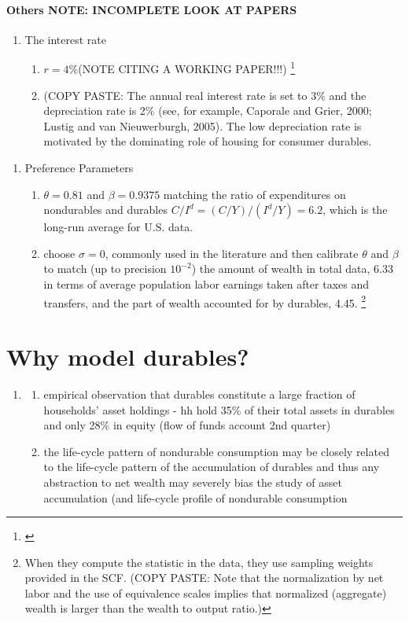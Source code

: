 \documentclass[a4paper,12pt]{article}
\begin{document}
\paragraph{Others NOTE: INCOMPLETE LOOK AT PAPERS}
\begin{enumerate}
\item The interest rate
\begin{enumerate}
\item \citep{FV&K2011} $r = 4\%$(NOTE CITING A WORKING PAPER!!!) \footnote{\citep{mcgrattan2001}}

\item \citep{hintermaier2010} (COPY PASTE: The annual real interest rate is set to 3\% and the depreciation rate is 2\% (see, for example, Caporale and Grier, 2000; Lustig and van Nieuwerburgh, 2005). The low depreciation rate is motivated by the dominating role of housing for consumer durables.
\end{enumerate}
\end{enumerate}

\begin{enumerate}
\item Preference Parameters
\begin{enumerate}
\item  \citep{FV&K2011} $\theta = 0.81$ and $\beta = 0.9375$ matching the ratio of expenditures on nondurables and durables $C/I^{d} = (C/Y)/(I^{d}/Y) = 6.2$, which is the long-run average for U.S. data.

\item \cite{hintermaier2010} choose $\sigma = 0$, commonly used in the literature and then calibrate $\theta$ and $\beta$ to match (up to precision $10^{-2}$) the amount of wealth in total data, 6.33 in terms of average population labor earnings taken after taxes and transfers, and the part of wealth accounted for by durables, 4.45. \footnote{When they compute the statistic in the data, they use sampling weights provided in the SCF. (COPY PASTE: Note that the normalization by net labor and the use of equivalence scales implies that normalized (aggregate) wealth is larger than the wealth to output ratio.)}
\end{enumerate}
\end{enumerate}
\section{Why model durables?}
\begin{enumerate}
\item \cite{FV&K2011} 
\begin{enumerate}
\item empirical observation that durables constitute a large fraction of households' asset holdings - hh hold 35\% of their total assets in durables and only 28\% in equity (flow of funds account 2nd quarter) 
\item the life-cycle pattern of nondurable consumption may be closely related to the life-cycle pattern of the accumulation of durables and thus any abstraction to net wealth may severely bias the study of asset accumulation (and life-cycle profile of nondurable consumption
\end{enumerate}
\end{enumerate}
\end{document}

